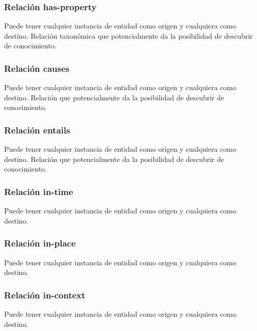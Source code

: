 \vspace{-0.1in}
\subsubsection{Relación has-property}
\vspace{-0.1in}
Puede tener cualquier instancia de entidad como origen y cualquiera como destino. Relación taxonómica que potencialmente da la posibilidad de descubrir de conocimiento.

\vspace{-0.1in}
\subsubsection{Relación causes}
\vspace{-0.1in}
Puede tener cualquier instancia de entidad como origen y cualquiera como destino. Relación que potencialmente da la posibilidad de descubrir de conocimiento.

\vspace{-0.1in}
\subsubsection{Relación entails}
\vspace{-0.1in}
Puede tener cualquier instancia de entidad como origen y cualquiera como destino. Relación que potencialmente da la posibilidad de descubrir de conocimiento.

\vspace{-0.1in}
\subsubsection{Relación in-time}
\vspace{-0.1in}
Puede tener cualquier instancia de entidad como origen y cualquiera como destino.

\vspace{-0.1in}
\subsubsection{Relación in-place}
\vspace{-0.1in}
Puede tener cualquier instancia de entidad como origen y cualquiera como destino.

\vspace{-0.1in}
\subsubsection{Relación in-context}
\vspace{-0.1in}
Puede tener cualquier instancia de entidad como origen y cualquiera como destino.

